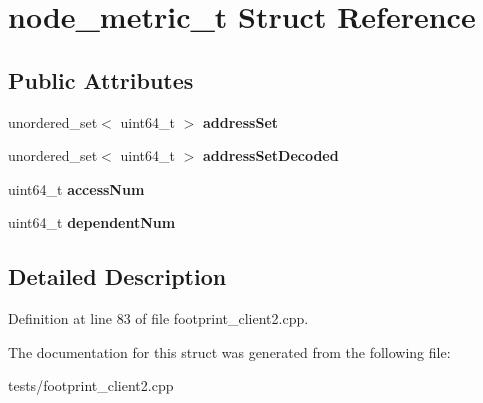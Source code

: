 \hypertarget{structnode__metric__t}{\section{node\-\_\-metric\-\_\-t Struct Reference}
\label{structnode__metric__t}
}
\subsection*{Public Attributes}
\begin{DoxyCompactItemize}
\item 
\hypertarget{structnode__metric__t_a9d3d67384302ccdf60f12750f4d408fe}{unordered\-\_\-set$<$ uint64\-\_\-t $>$ {\bfseries address\-Set}}\label{structnode__metric__t_a9d3d67384302ccdf60f12750f4d408fe}

\item 
\hypertarget{structnode__metric__t_a08fb018d20f5e82a4b297b963f6d5345}{unordered\-\_\-set$<$ uint64\-\_\-t $>$ {\bfseries address\-Set\-Decoded}}\label{structnode__metric__t_a08fb018d20f5e82a4b297b963f6d5345}

\item 
\hypertarget{structnode__metric__t_a26a7056d006d17b42ac16b062013a835}{uint64\-\_\-t {\bfseries access\-Num}}\label{structnode__metric__t_a26a7056d006d17b42ac16b062013a835}

\item 
\hypertarget{structnode__metric__t_ae63455f89d2ae0ee84fe89785ff8bf8d}{uint64\-\_\-t {\bfseries dependent\-Num}}\label{structnode__metric__t_ae63455f89d2ae0ee84fe89785ff8bf8d}

\end{DoxyCompactItemize}


\subsection{Detailed Description}


Definition at line 83 of file footprint\-\_\-client2.\-cpp.



The documentation for this struct was generated from the following file\-:\begin{DoxyCompactItemize}
\item 
tests/footprint\-\_\-client2.\-cpp\end{DoxyCompactItemize}
